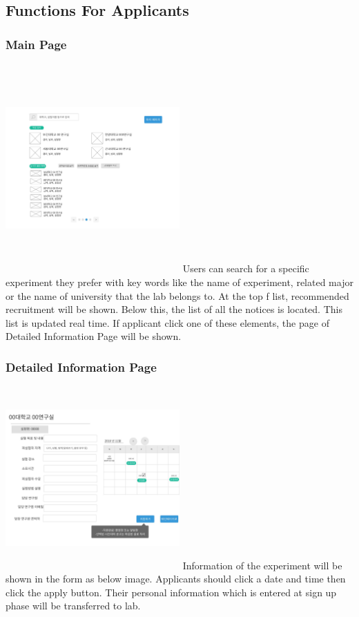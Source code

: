 \documentclass[letterpaper, 10 pt, conference]{ieeeconf}  %
\begin{document}
\subsection{Functions For Applicants}
\subsubsection{Main Page\\}
\includegraphics[width=0.5\textwidth,height = 8cm]{Oven_ver2/ver2]11_applicantMainPage.jpg}
Users can search for a specific experiment they prefer with key words like the name of experiment, related major or the name of university that the lab belongs to. At the top f list, recommended recruitment will be shown. Below this, the list of all the notices is located. This list is updated real time. If applicant click one of these elements, the page of Detailed Information Page will be shown. 



\subsubsection{Detailed Information Page}
\includegraphics[width=0.5\textwidth,height = 7cm]{Oven_ver2/ver2]12_detailedExperimentPage.jpg}
Information of the experiment will be shown in the form as below image. Applicants should click a date and time then click the apply button. Their personal information which is entered at sign up phase will be transferred to lab. 
\end{document}
